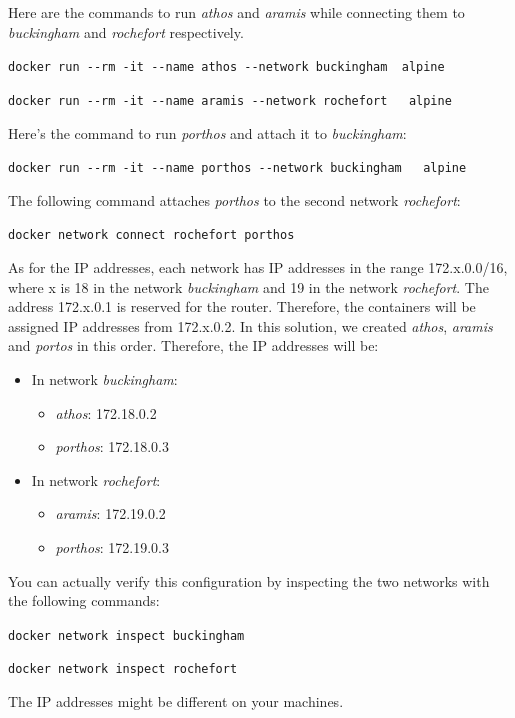 \documentclass[
]{article}
\providecommand{\tightlist}{%
  \setlength{\itemsep}{0pt}\setlength{\parskip}{0pt}}
\newenvironment{infobox}[1]
  {
  \begin{itemize}
  \renewcommand{\labelitemi}{
    \raisebox{-.7\height}[0pt][0pt]{
      
    }
  }
  \setlength{\fboxsep}{1em}
  \begin{whitebox}
  \item
  }
  {
  \end{whitebox}
  \end{itemize}
  }
\theoremstyle{definition}
\theoremstyle{definition}
\theoremstyle{definition}
\theoremstyle{remark}
\begin{document}
\begin{infobox}{exercisebox}
Here are the commands to run \emph{athos} and \emph{aramis} while connecting
them to \emph{buckingham} and \emph{rochefort} respectively.

\texttt{docker\ run\ -\/-rm\ -it\ -\/-name\ athos\ -\/-network\ buckingham\ \ alpine}

\texttt{docker\ run\ -\/-rm\ -it\ -\/-name\ aramis\ -\/-network\ rochefort\ \ \ alpine}

Here's the command to run \emph{porthos} and attach it to
\emph{buckingham}:

\texttt{docker\ run\ -\/-rm\ -it\ -\/-name\ porthos\ -\/-network\ buckingham\ \ \ alpine}

The following command attaches \emph{porthos} to the second network \emph{rochefort}:

\texttt{docker\ network\ connect\ rochefort\ porthos}

As for the IP addresses, each network has IP addresses
in the range 172.x.0.0/16, where x is 18 in the
network \emph{buckingham} and 19 in the network \emph{rochefort}.
The address 172.x.0.1 is reserved for the router.
Therefore, the containers will be assigned
IP addresses from 172.x.0.2.
In this solution, we created \emph{athos}, \emph{aramis} and \emph{portos}
in this order.
Therefore, the IP addresses will be:

\begin{itemize}
\tightlist
\item
  In network \emph{buckingham}:

  \begin{itemize}
  \tightlist
  \item
    \emph{athos}: 172.18.0.2
  \item
    \emph{porthos}: 172.18.0.3
  \end{itemize}
\item
  In network \emph{rochefort}:

  \begin{itemize}
  \tightlist
  \item
    \emph{aramis}: 172.19.0.2
  \item
    \emph{porthos}: 172.19.0.3
  \end{itemize}
\end{itemize}

You can actually verify this configuration by inspecting
the two networks with the following commands:

\texttt{docker\ network\ inspect\ buckingham}

\texttt{docker\ network\ inspect\ rochefort}

The IP addresses might be different on your machines.

\end{infobox}
\end{document}
